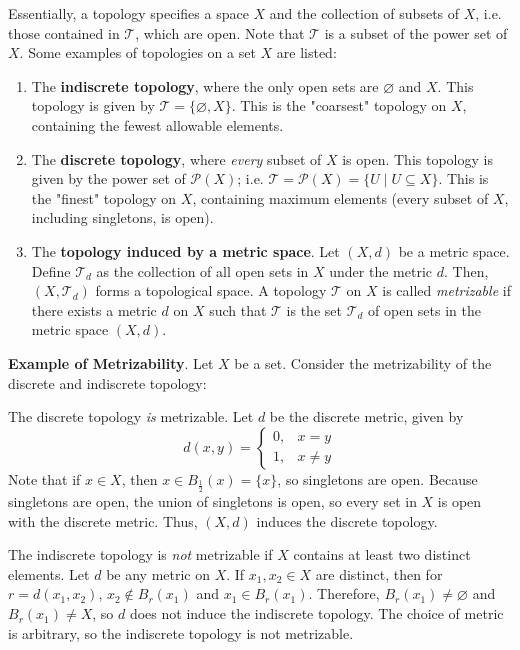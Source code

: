 Essentially, a topology specifies a space $X$ and the collection of subsets of $X$, i.e. those contained in $\mathcal{T}$, which are open. Note that $\mathcal{T}$ is a subset of the power set of $X$. Some examples of topologies on a set $X$ are listed: \begin{enumerate}
    \item[] The \textbf{indiscrete topology}, where the only open sets are $\varnothing$ and $X$. This topology is given by $\mathcal{T} = \{\varnothing,X\}$. This is the "coarsest" topology on $X$, containing the fewest allowable elements.
    \item[] The \textbf{discrete topology}, where \textit{every} subset of $X$ is open. This topology is given by the power set of $\mathcal{P}(X)$; i.e. $\mathcal{T} = \mathcal{P}(X) = \{U\mid U\subseteq X\}$. This is the "finest" topology on $X$, containing maximum elements (every subset of $X$, including singletons, is open).
    \item[] The \textbf{topology induced by a metric space}. Let $(X,d)$ be a metric space. Define $\mathcal{T}_d$ as the collection of all open sets in $X$ under the metric $d$. Then, $(X,\mathcal{T}_d)$ forms a topological space. A topology $\mathcal{T}$ on $X$ is called \textit{metrizable} if there exists a metric $d$ on $X$ such that $\mathcal{T}$ is the set $\mathcal{T}_d$ of open sets in the metric space $(X,d)$.
\end{enumerate}

\begin{framed}
\textbf{Example of Metrizability}. Let $X$ be a set. Consider the metrizability of the discrete and indiscrete topology:

The discrete topology \textit{is} metrizable. Let $d$ be the discrete metric, given by \[d(x,y) = \begin{cases}
    0,& x=y\\
    1,&x\neq y
\end{cases}\] Note that if $x\in X$, then $x\in B_\frac{1}{2}(x) = \{x\}$, so singletons are open. Because singletons are open, the union of singletons is open, so every set in $X$ is open with the discrete metric. Thus, $(X,d)$ induces the discrete topology.

The indiscrete topology is \textit{not} metrizable if $X$ contains at least two distinct elements. Let $d$ be any metric on $X$. If $x_1,x_2\in X$ are distinct, then for $r=d(x_1,x_2)$, $x_2\notin B_r(x_1)$ and $x_1\in B_r(x_1)$. Therefore, $B_r(x_1)\neq \varnothing$ and $B_r(x_1)\neq X$, so $d$ does not induce the indiscrete topology. The choice of metric is arbitrary, so the indiscrete topology is not metrizable.
\end{framed}


